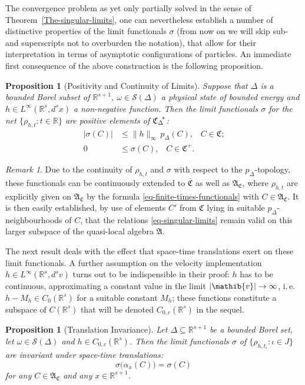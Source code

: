 \documentclass[11pt,twoside,openright]{report}
\theoremstyle{definition}
\theoremstyle{plain}
\newtheorem{Pro}[Def]{Proposition}
\theoremstyle{remark}
\newtheorem*{Rem}{Remark}
\theoremstyle{assumption}
\newcommand{\bset}[1]{\bigl\{ #1 \bigr\}}
\newcommand{\abs}[1]{\lvert #1 \rvert}
\newcommand{\babs}[1]{\bigl\lvert #1 \bigr\rvert}
\newcommand{\norm}[1]{\lVert #1 \rVert}
\newcommand{\pD}{p_\Delta}
\newcommand{\pDx}[1]{p_\Delta ( #1 )}
\newcommand{\Rbb}{\mathbb{R}}
\newcommand{\Afrak}{\mathfrak{A}}
\newcommand{\Cfrak}{\mathfrak{C}}
\newcommand{\vib}{\mathib{v}}
\newcommand{\Sscr}{\mathscr{S}}
\newcommand{\Rs}{\mathbb{R}^s}
\newcommand{\Rsone}{\mathbb{R}^{s + 1}}
\newcommand{\Cfrakbar}{\overline{\mathfrak{C}}}
\newcommand{\AC}{\mathfrak{A}_\mathfrak{C}}
\newcommand{\CDstar}{{\mathfrak{C}_\Delta}^{\negthickspace *}}
\newcommand{\ax}{\alpha_x}
\begin{document}
The convergence problem as yet only partially solved in the sense of
Theorem~\ref{The-singular-limits}, one can nevertheless establish a
number of distinctive properties of the limit functionals $\sigma$
(from now on we will skip sub- and superscripts not to overburden the
notation), that allow for their interpretation in terms of asymptotic
configurations of particles. An immediate first consequence of the
above construction is the following proposition.
\begin{Pro}[Positivity and Continuity of Limits]
  \label{Pro-positivity-of-limits}
  Suppose that $\Delta$ is a bounded Borel subset of $\Rsone$, $\omega
  \in \Sscr ( \Delta )$ a physical state of bounded energy and $h \in
  L^\infty ( \Rs , d^s x )$ a non-negative function. Then the limit
  functionals $\sigma$ for the net $\bset{\rho_{h , t} : t \in \Rbb}$
  are positive elements of $\CDstar$:
  \begin{subequations}
    \begin{align}
      \babs{\sigma ( C )} & \leqslant \norm{h}_\infty \, \pDx{C}
      \text{,} \quad C \in \Cfrak \text{;} \\
      0 & \leqslant \sigma ( C ) \text{,} \quad C \in \Cfrak^+
      \text{.}
    \end{align}
  \end{subequations}
\end{Pro}
\begin{Rem}
  Due to the continuity of $\rho_{h , t}$ and $\sigma$ with respect to
  the $\pD$-topology, these functionals can be continuously extended
  to $\Cfrakbar$ as well as $\AC$, where $\rho_{h , t}$ are explicitly
  given on $\AC$ by the formula \eqref{eq-finite-times-functionals}
  with $C \in \AC$. It is then easily established, by use of elements
  $C'$ from $\Cfrak$ lying in suitable $\pD$-neighbourhoods of $C$,
  that the relations \eqref{eq-singular-limits} remain valid on this
  larger subspace of the quasi-local algebra $\Afrak$.
\end{Rem}
The next result deals  with the effect that space-time translations
exert on these limit functionals. A further assumption on the velocity
implementation $h \in L^\infty ( \Rs , d^s v )$ turns out to be
indispensible in their proof: $h$ has to be continuous, approximating
a constant value in the limit $\abs{\vib} \rightarrow \infty$,
i.\,e.~$h - M_h \in C_0 ( \Rs )$ for a suitable constant $M_h$; these
functions constitute a subspace of $C ( \Rs )$ that will be denoted
$C_{0 , c} ( \Rs )$ in the sequel.
\begin{Pro}[Translation Invariance]
  \label{Pro-translation-invariance}
  Let $\Delta \subseteq \Rsone$ be a bounded Borel set, let $\omega
  \in \Sscr ( \Delta )$ and $h \in C_{0 , c} ( \Rs )$. Then the limit
  functionals $\sigma$ of $\bset{\rho_{h , t_\iota} : \iota \in J}$
  are invariant under space-time translations:
  \begin{equation}
  \label{eq-sigma-invariance}
    \sigma \bigl( \ax ( C ) \bigr) = \sigma ( C )
  \end{equation}
  for any $C \in \AC$ and any $x \in \Rsone$.
\end{Pro}
\end{document}
